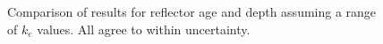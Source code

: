 \begin{figure}[ht]
\begin{center}
{}
\caption[scale=0.3]{Comparison of results for reflector age and depth assuming a range of $k_e$ values. All agree to within uncertainty.}
\end{center}
\label{fig:ke}
\end{figure}



%

%



